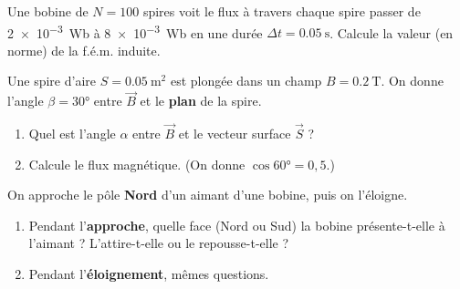 \documentclass[11pt,a4paper]{article}
\newcommand{\vv}[1]{\vec{#1}}\newcommand{\ds}{\displaystyle}
\begin{document}
\begin{exo}
Une bobine de $N=100$ spires voit le flux à travers chaque spire passer de \qty{2e-3}{\weber} à
\qty{8e-3}{\weber} en une durée $\Delta t=\qty{0.05}{\second}$. Calcule la valeur (en norme) de la
f.é.m. induite.
\end{exo}

\begin{exo}
Une spire d'aire $S=\qty{0.05}{\metre\squared}$ est plongée dans un champ $B=\qty{0.2}{\tesla}$. On
donne l'angle $\beta=\ang{30}$ entre $\vv{B}$ et le \textbf{plan} de la spire.
\begin{enumerate}[label=\alph*)]
  \item Quel est l'angle $\alpha$ entre $\vv{B}$ et le vecteur surface $\vv{S}$ ?
  \item Calcule le flux magnétique. (On donne $\cos\ang{60}=0{,}5$.)
\end{enumerate}
\end{exo}

\begin{exo}
On approche le pôle \textbf{Nord} d'un aimant d'une bobine, puis on l'éloigne.
\begin{center}
\end{center}
\begin{enumerate}[label=\alph*)]
  \item Pendant l'\textbf{approche}, quelle face (Nord ou Sud) la bobine présente-t-elle à l'aimant ?
        L'attire-t-elle ou le repousse-t-elle ?
  \item Pendant l'\textbf{éloignement}, mêmes questions.
\end{enumerate}
\end{exo}
\end{document}
